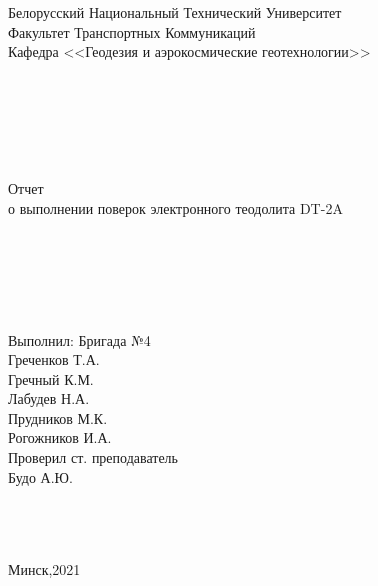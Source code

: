 \documentclass[a4paper]{article}
\begin{document}
\begin{titlepage}
\large{
\begin{center}

Белорусский Национальный Технический Университет\\
Факультет Транспортных Коммуникаций\\
Кафедра <<Геодезия и аэрокосмические геотехнологии>>\\
~\\
~\\
~\\
~\\
~\\
~\\
Отчет\\
о выполнении поверок электронного теодолита DT-2A\\
~\\
~\\
~\\
~\\
~\\
\end{center}

\begin{flushright}
Выполнил: Бригада №4\\
Греченков Т.А.\\
Гречный К.М.\\
Лабудев Н.А.\\
Прудников М.К.\\
Рогожников И.А.\\
Проверил ст. преподаватель\\
Будо А.Ю.
~\\
~\\
~\\
~\\
\begin{center}
Минск,2021
\end{center}

\end{flushright}
}
\end{titlepage}
\end{document}
